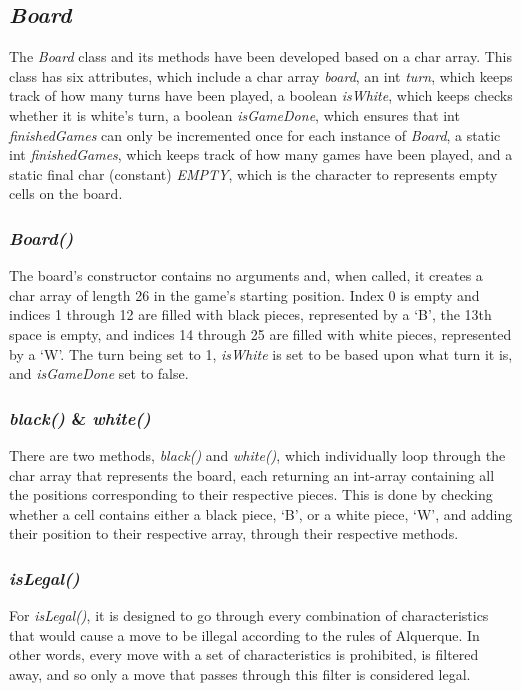 \documentclass[12pt, a4paper]{article}
\begin{document}
\subsection{\emph{Board}}
The \emph{Board} class and its methods have been developed based on a char array. This class has six attributes, which include a char array \emph{board}, an int \emph{turn}, which keeps track of how many turns have been played, a boolean \emph{isWhite}, which keeps checks whether it is white’s turn, a boolean \emph{isGameDone}, which ensures that int \emph{finishedGames} can only be incremented once for each instance of \emph{Board}, a static int \emph{finishedGames}, which keeps track of how many games have been played, and a static final char (constant) \emph{EMPTY}, which is the character to represents empty cells on the board.

\subsubsection{\emph{Board()}}
The board's constructor contains no arguments and, when called, it creates a char array of length 26 in the game's starting position. Index 0 is empty and indices 1 through 12 are filled with black pieces, represented by a ‘B’, the 13th space is empty, and indices 14 through 25 are filled with white pieces, represented by a ‘W’. The turn being set to 1, \emph{isWhite} is set to be based upon what turn it is, and \emph{isGameDone} set to false. 

\subsubsection{ \emph{black()} \& \emph{white()}}
There are two methods, \emph{black()} and \emph{white()}, which individually loop through the char array that represents the board, each returning an int-array containing all the positions corresponding to their respective pieces. This is done by checking whether a cell contains either a black piece, ‘B’, or a white piece, ‘W’, and adding their position to their respective array, through their respective methods.

\subsubsection{\emph{isLegal()}}
For \emph{isLegal()}, it is designed to go through every combination of characteristics that would cause a move to be illegal according to the rules of Alquerque. In other words, every move with a set of characteristics is prohibited, is filtered away, and so only a move that passes through this filter is considered legal.
\end{document}

